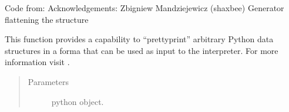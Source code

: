 \documentclass[letterpaper,10pt,english]{sphinxmanual}
\begin{document}

\begin{fulllineitems}
\label{\detokenize{_autosummary/graphdb_builder:graphdb_builder.builder_utils.flatten}}
Code from: 
Acknowledgements: Zbigniew Mandziejewicz (shaxbee)
Generator flattening the structure

\begin{sphinxVerbatim}[commandchars=\\\{\}]
\PYG{p}{[} \PYG{p}{[}   \PYG{p}{[}\PYG{p}{]} \PYG{p}{[} \PYG{p}{[}   \PYG{p}{[}\PYG{p}{]} \PYG{p}{]}\PYG{p}{]} \PYG{p}{]}\PYG{p}{]}
\end{sphinxVerbatim}

\end{fulllineitems}


\begin{fulllineitems}
\label{\detokenize{_autosummary/graphdb_builder:graphdb_builder.builder_utils.pretty_print}}
This function provides a capability to “pretty\sphinxhyphen{}print” arbitrary Python data structures in a forma that can be     used as input to the interpreter. For more information visit .
\begin{quote}\begin{description}
\item[{Parameters}] \leavevmode
{} \textendash{} python object.

\end{description}\end{quote}

\end{fulllineitems}
\end{document}
